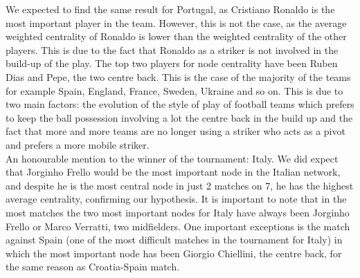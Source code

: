 \documentclass[12pt, a4paper]{article}
\begin{document}
We expected to find the same result for Portugal, as Cristiano Ronaldo is the most important player in the team. However, this is not the case, as the average weighted centrality of Ronaldo is lower than the weighted centrality of the other players. This is due to the fact that Ronaldo as a striker is not involved in the build-up of the play. The top two players for node centrality have been Ruben Dias and Pepe, the two centre back. This is the case of the majority of the teams for example Spain, England, France, Sweden, Ukraine and so on. This is due to two main factors: the evolution of the style of play of football teams which prefers to keep the ball possession involving a lot the centre back in the build up and the fact that more and more teams are no longer using a striker who acts as a pivot and prefers a more mobile striker. \\
An honourable mention to the winner of the tournament: Italy. We did expect that Jorginho Frello would be the most important node in the Italian network, and despite he is the most central node in just 2 matches on 7, he has the highest average centrality, confirming our hypothesis. It is important to note that in the most matches the two most important nodes for Italy have always been Jorginho Frello or Marco Verratti, two midfielders. One important exceptions is the match against Spain (one of the most difficult matches in the tournament for Italy) in which the most important node has been Giorgio Chiellini, the centre back, for the same reason as Croatia-Spain match. \\


\end{document}
